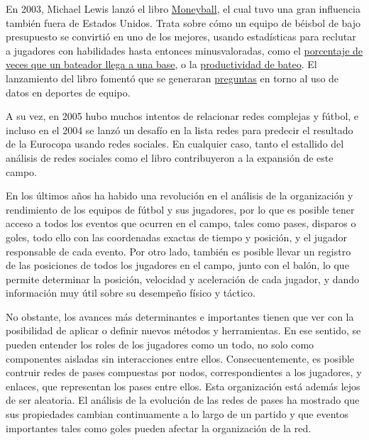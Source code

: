 En 2003, Michael Lewis lanzó el libro \href{https://en.wikipedia.org/wiki/Moneyball}{Moneyball}, el cual tuvo una gran 
influencia también fuera de Estados Unidos. Trata sobre cómo
un equipo de béisbol de bajo presupuesto se convirtió en uno de los mejores, usando estadísticas para reclutar a jugadores 
con habilidades hasta entonces minusvaloradas, como el \href{https://en.wikipedia.org/wiki/On-base_percentage}{porcentaje de veces que un bateador llega a una base}, o 
la \href{https://en.wikipedia.org/wiki/Slugging_percentage}{productividad de bateo}\cite{moneyball-ev}. El lanzamiento del 
libro fomentó que se generaran \href{https://thesportjournal.org/article/an-examination-of-the-moneyball-theory-a-baseball-statistical-analysis/}{preguntas} en torno al uso de datos en deportes de equipo. 

A su vez, en 2005 hubo muchos intentos de relacionar redes complejas y fútbol\cite{lee2005passes}, 
e incluso en el 2004 se lanzó un desafío en la lista redes\cite{Bundio_Matías_2008} para predecir el resultado de la Eurocopa usando 
redes sociales. En cualquier caso, tanto el estallido del análisis de redes sociales como el libro contribuyeron 
a la expansión de este campo.

En los últimos años ha habido una revolución en el análisis de la organización 
y rendimiento de los equipos de fútbol y sus jugadores, por lo que es posible tener acceso a todos los 
eventos que ocurren en el campo, tales como pases, disparos o goles, todo ello con las coordenadas 
exactas de tiempo y posición, y el jugador responsable de cada evento. Por otro lado, también es 
posible llevar un registro de las posiciones de todos los jugadores en el campo, junto con el balón, 
lo que permite determinar la posición, velocidad y aceleración de cada jugador, y dando información 
muy útil sobre su desempeño físico y táctico. 

No obstante, los avances más determinantes e importantes tienen que ver con la posibilidad de aplicar o 
definir nuevos métodos y herramientas. En ese sentido, se pueden entender los roles de los jugadores 
como un todo, no solo como componentes aisladas sin interacciones entre ellos. Consecuentemente, es 
posible contruir redes de pases compuestas por nodos, correspondientes a los jugadores, y enlaces, 
que representan los pases entre ellos. Esta organización está además lejos de ser 
aleatoria. El análisis de la evolución de las redes de pases ha mostrado que sus propiedades 
cambian continuamente a lo largo de un partido y que eventos importantes tales como goles 
pueden afectar la organización de la red.\cite{spatial-and-temporal-entropies}

